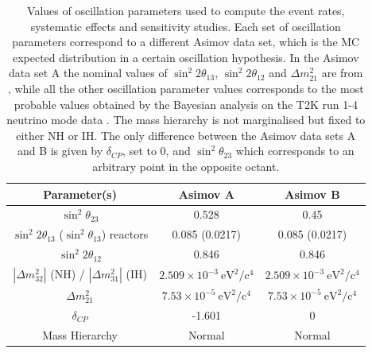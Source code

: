 \begin{table}
\centering
 \begin{tabular}{| c | c | c |}
 \hline
 Parameter(s)                                               		   		&      Asimov A 	  						 & Asimov B   \\
\hline
$\sin^{2}\theta_{23}$                                       				&      0.528								&  0.45   \\
$\sin^{2} 2 \theta_{13}$ ($\sin^{2} \theta_{13}$) reactors		&      0.085 (0.0217)							&  0.085 (0.0217)	 	\\
$\sin^{2} 2 \theta_{12}$  								&      0.846              							&  0.846 		 \\
$|\Delta m^{2}_{32}|$ (NH) / $|\Delta m^{2}_{31}|$ (IH)      		&     	$2.509 \times 10^{-3}~\mbox{eV}^2/\mbox{c}^4$	&  $2.509 \times 10^{-3}~\mbox{eV}^2/\mbox{c}^4$		 \\
$\Delta m^{2}_{21}$      								&       $7.53 \times 10^{-5}~\mbox{eV}^2/\mbox{c}^4$ 	&  $7.53 \times 10^{-5}~\mbox{eV}^2/\mbox{c}^4$ 			\\
$\delta_{CP}$                                               				&       -1.601								& 0    \\
Mass Hierarchy										&        Normal 	         						&  Normal	 \\  
\hline
\end{tabular}
\caption{
Values of oscillation parameters used to compute the event rates,
systematic effects and sensitivity studies.
Each set of oscillation parameters correspond to a different 
Asimov data set, which is the MC expected distribution in a certain
oscillation hypothesis.
In the Asimov data set A the nominal values of 
$\sin^2 2 \theta_{13}$, 
$\sin^2 2 \theta_{12}$
and 
$\Delta m^2_{21}$ 
are from \cite{pdg_2014},
while all the other oscillation parameter values corresponds to the most probable values 
obtained by the Bayesian analysis on the T2K run 1-4 neutrino mode data \cite{T2KLongPaper}.
The mass hierarchy is not marginalised but fixed to either NH or IH.
The only difference between the Asimov data sets A and B is 
given by $\delta_{CP}$, set to 0, 
and $\sin^{2}\theta_{23}$ 
which corresponds to an arbitrary point in the opposite octant.
}
\label{tab:osc_params_joint_asimov}
\end{table}

